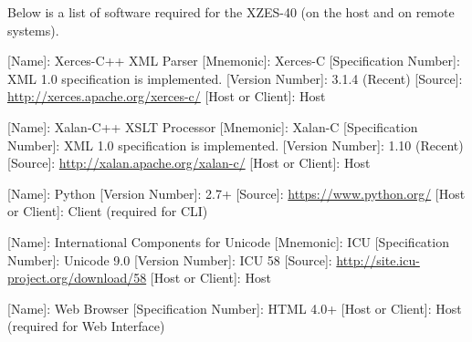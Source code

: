 Below is a list of software required for the XZES-40 (on the host and on remote systems).

\begin{description}
  \item {
    \begin{description}
      \item {
        [Name]: Xerces-C++ XML Parser
        [Mnemonic]: Xerces-C
        [Specification Number]: XML 1.0 specification is implemented.
        [Version Number]: 3.1.4 (Recent)
        [Source]: \url{http://xerces.apache.org/xerces-c/}
        [Host or Client]: Host
      }
    \end{description}
  }
  \item {
    \begin{description}
      \item {
        [Name]: Xalan-C++ XSLT Processor 
        [Mnemonic]: Xalan-C
        [Specification Number]: XML 1.0 specification is implemented.
        [Version Number]: 1.10 (Recent)
        [Source]: \url{http://xalan.apache.org/xalan-c/}
        [Host or Client]: Host
      }
    \end{description}
  }
  \item {
    \begin{description}
      \item {
        [Name]: Python
        [Version Number]: 2.7+
        [Source]: \url{https://www.python.org/}
        [Host or Client]: Client (required for CLI)
      }
    \end{description}
  }
  \item {
    \begin{description}
      \item {
        [Name]: International Components for Unicode
        [Mnemonic]: ICU
        [Specification Number]: Unicode 9.0
        [Version Number]: ICU 58
        [Source]: \url{http://site.icu-project.org/download/58}
        [Host or Client]: Host
      }
    \end{description}
  }
  \item {
    \begin{description}
      \item {
        [Name]: Web Browser
        [Specification Number]: HTML 4.0+
        [Host or Client]: Host (required for Web Interface)
      }
    \end{description}
  }
\end{description}



